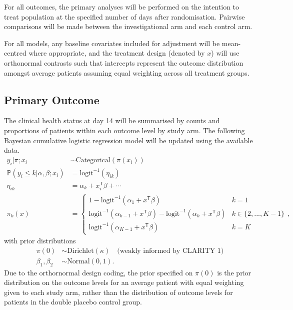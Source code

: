 \documentclass[11pt,parskip=half-]{scrartcl}
\begin{document}
For all outcomes, the primary analyses will be performed on the intention to treat population at the specified number of days after randomisation. Pairwise comparisons will be made between the investigational arm and each control arm.

For all models, any baseline covariates included for adjustment will be mean-centred where appropriate, and the treatment design (denoted by $x$) will use orthonormal contrasts such that intercepts represent the outcome distribution amongst average patients assuming equal weighting across all treatment groups.

\subsection{Primary Outcome}
The clinical health status at day 14 will be summarised by counts and proportions of patients within each outcome level by study arm. The following Bayesian cumulative logistic regression model will be updated using the available data.
$$
    \begin{aligned}
        y_{i} | \pi;x_i                            & \sim \text{Categorical}(\pi(x_i))           \\
        \mathbb P(y_i \leq k | \alpha, \beta; x_i) & = \text{logit}^{-1}(\eta_{ik})              \\
        \eta_{ik}                                  & = \alpha_k + x_i^{\mathsf{T}}\beta + \cdots \\
        \pi_k(x)                                   & = \begin{cases}
            1 - \text{logit}^{-1}(\alpha_1 + x^\mathsf{T}\beta)                                                       & k=1               \\
            \text{logit}^{-1}(\alpha_{k-1} + x^\mathsf{T}\beta) - \text{logit}^{-1}(\alpha_{k} + x^\mathsf{T}\beta) & k\in\{2,...,K-1\} \\
            \text{logit}^{-1}(\alpha_{K-1} + x^\mathsf{T}\beta)                                                       & k=K
        \end{cases},
    \end{aligned}
$$
with prior distributions
$$
    \begin{aligned}
        \pi(0)          & \sim \text{Dirichlet}(\kappa) \quad \text{(weakly informed by CLARITY 1)} \\
        \beta_1,\beta_2 & \sim \text{Normal}(0, 1).
    \end{aligned}
$$
Due to the orthornormal design coding, the prior specified on $\pi(0)$ is the prior distribution on the outcome levels for an average patient with equal weighting given to each study arm, rather than the distribution of outcome levels for patients in the double placebo control group.
\end{document}
